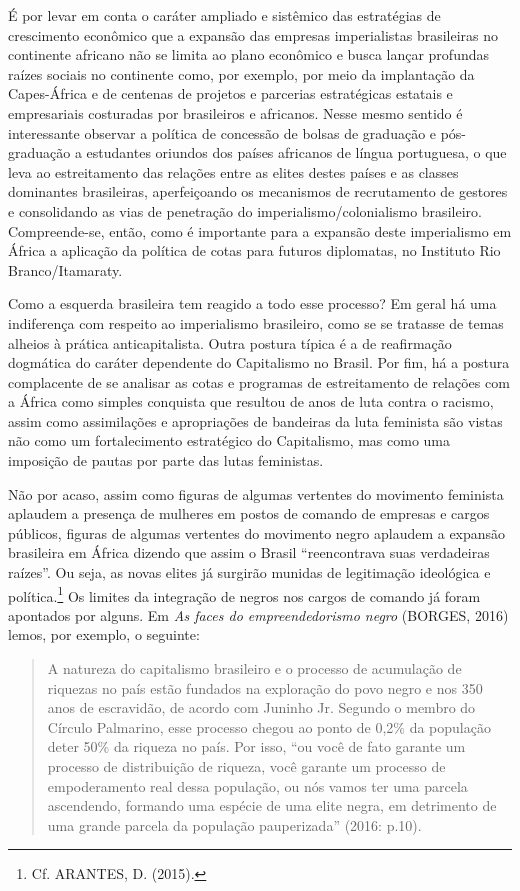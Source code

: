 É por levar em conta o caráter ampliado e sistêmico das estratégias de
crescimento econômico que a expansão das empresas imperialistas
brasileiras no continente africano não se limita ao plano econômico e
busca lançar profundas raízes sociais no continente como, por exemplo,
por meio da implantação da Capes-África e de centenas de projetos e
parcerias estratégicas estatais e empresariais costuradas por
brasileiros e africanos. Nesse mesmo sentido é interessante observar a
política de concessão de bolsas de graduação e pós-graduação a
estudantes oriundos dos países africanos de língua portuguesa, o que
leva ao estreitamento das relações entre as elites destes países e as
classes dominantes brasileiras, aperfeiçoando os mecanismos de
recrutamento de gestores e consolidando as vias de penetração do
imperialismo/colonialismo brasileiro. Compreende-se, então, como é
importante para a expansão deste imperialismo em África a aplicação da
política de cotas para futuros diplomatas, no Instituto Rio
Branco/Itamaraty.

Como a esquerda brasileira tem reagido a todo esse processo? Em geral há
uma indiferença com respeito ao imperialismo brasileiro, como se se
tratasse de temas alheios à prática anticapitalista. Outra postura
típica é a de reafirmação dogmática do caráter dependente do Capitalismo
no Brasil. Por fim, há a postura complacente de se analisar as cotas e
programas de estreitamento de relações com a África como simples
conquista que resultou de anos de luta contra o racismo, assim como
assimilações e apropriações de bandeiras da luta feminista são vistas
não como um fortalecimento estratégico do Capitalismo, mas como uma
imposição de pautas por parte das lutas feministas.

Não por acaso, assim como figuras de algumas vertentes do movimento
feminista aplaudem a presença de mulheres em postos de comando de
empresas e cargos públicos, figuras de algumas vertentes do movimento
negro aplaudem a expansão brasileira em África dizendo que assim o
Brasil ``reencontrava suas verdadeiras raízes''. Ou seja, as novas
elites já surgirão munidas de legitimação ideológica e
política.\footnote{Cf. ARANTES, D. (2015).} Os limites da integração de
negros nos cargos de comando já foram apontados por alguns. Em \emph{As
faces do empreendedorismo negro} (BORGES, 2016) lemos, por exemplo, o
seguinte:

\begin{quote}
A natureza do capitalismo brasileiro e o processo de acumulação de
riquezas no país estão fundados na exploração do povo negro e nos 350
anos de escravidão, de acordo com Juninho Jr. Segundo o membro do
Círculo Palmarino, esse processo chegou ao ponto de 0,2\% da população
deter 50\% da riqueza no país. Por isso, ``ou você de fato garante um
processo de distribuição de riqueza, você garante um processo de
empoderamento real dessa população, ou nós vamos ter uma parcela
ascendendo, formando uma espécie de uma elite negra, em detrimento de
uma grande parcela da população pauperizada'' (2016: p.10).
\end{quote}

